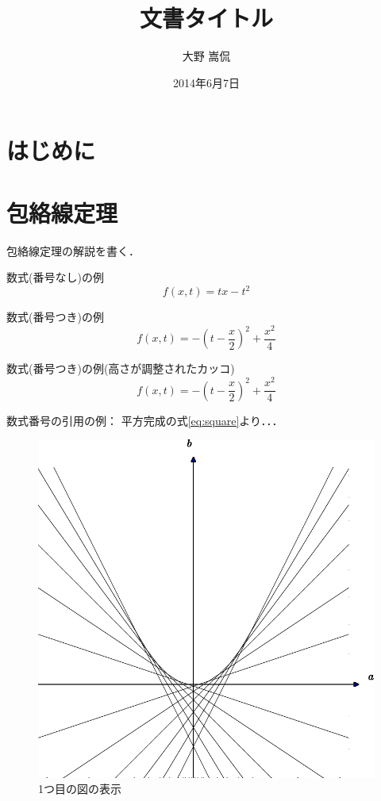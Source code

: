 \documentclass[11pt,a4j,fleqn]{jarticle}
\title{文書タイトル}
\author{大野 嵩侃}
\date{2014年6月7日}
\begin{document}
\maketitle

\section{はじめに}



\section{包絡線定理}

包絡線定理の解説を書く．

数式(番号なし)の例
\[
f(x, t) = t x - t^2
\]


数式(番号つき)の例
\begin{equation}
f(x, t)  = -(t - \frac{x}{2})^2 + \frac{x^2}{4} \label{eq:square}
\end{equation}

数式(番号つき)の例(高さが調整されたカッコ)
\begin{equation}
f(x, t) = -\left(t - \frac{x}{2}\right)^2 + \frac{x^2}{4} \label{eq:square-2}
\end{equation}



数式番号の引用の例：
平方完成の式\eqref{eq:square}より．．．

\begin{figure}
 \centering
 \includegraphics{envelope0.pdf}
 \caption{1つ目の図の表示}
 \label{fig:1}
\end{figure}
\end{document}
